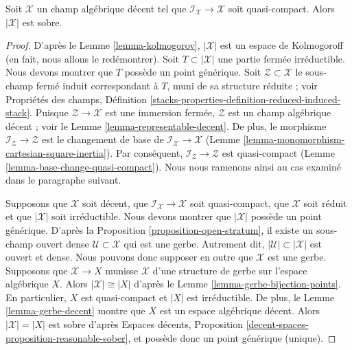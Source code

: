 \begin{proposition}
\label{proposition-decent-sober}
Soit $\mathcal{X}$ un champ alg\'ebrique d\'ecent tel que
$\mathcal{I}_\mathcal{X} \to \mathcal{X}$ soit quasi-compact.
Alors $|\mathcal{X}|$ est sobre.
\end{proposition}

\begin{proof}
D'apr\`es le Lemme \ref{lemma-kolmogorov}, $|\mathcal{X}|$ est un espace de Kolmogoroff
(en fait, nous allons le red\'emontrer).
Soit $T \subset |\mathcal{X}|$ une partie ferm\'ee irr\'eductible.
Nous devons montrer que $T$ poss\`ede un point g\'en\'erique.
Soit $\mathcal{Z} \subset \mathcal{X}$ le sous-champ ferm\'e induit
correspondant \`a $T$, muni de sa structure r\'eduite ; voir Propri\'et\'es des champs, D\'efinition
\ref{stacks-properties-definition-reduced-induced-stack}.
Puisque $\mathcal{Z} \to \mathcal{X}$ est une immersion ferm\'ee,
$\mathcal{Z}$ est un champ alg\'ebrique d\'ecent ; voir le
Lemme \ref{lemma-representable-decent}.
De plus, le morphisme $\mathcal{I}_\mathcal{Z} \to \mathcal{Z}$
est le changement de base de $\mathcal{I}_\mathcal{X} \to \mathcal{X}$
(Lemme \ref{lemma-monomorphism-cartesian-square-inertia}).
Par cons\'equent, $\mathcal{I}_\mathcal{Z} \to \mathcal{Z}$ est quasi-compact
(Lemme \ref{lemma-base-change-quasi-compact}).
Nous nous ramenons ainsi au cas examin\'e dans le paragraphe suivant.

\medskip\noindent
Supposons que $\mathcal{X}$ soit d\'ecent, que
$\mathcal{I}_\mathcal{X} \to \mathcal{X}$ soit quasi-compact,
que $\mathcal{X}$ soit r\'eduit et que $|\mathcal{X}|$ soit irr\'eductible.
Nous devons montrer que $|\mathcal{X}|$ poss\`ede un point g\'en\'erique.
D'apr\`es la Proposition \ref{proposition-open-stratum},
il existe un sous-champ ouvert dense $\mathcal{U} \subset \mathcal{X}$
qui est une gerbe. Autrement dit, $|\mathcal{U}| \subset |\mathcal{X}|$
est ouvert et dense.
Nous pouvons donc supposer en outre que $\mathcal{X}$ est une gerbe.
Supposons que $\mathcal{X} \to X$ munisse $\mathcal{X}$ d'une structure de gerbe sur
l'espace alg\'ebrique $X$. Alors $|\mathcal{X}| \cong |X|$ d'apr\`es le
Lemme \ref{lemma-gerbe-bijection-points}.
En particulier, $X$ est quasi-compact et $|X|$ est irr\'eductible.
De plus, le Lemme \ref{lemma-gerbe-decent} montre
que $X$ est un espace alg\'ebrique d\'ecent.
Alors $|\mathcal{X}| = |X|$ est sobre d'apr\`es
Espaces d\'ecents, Proposition \ref{decent-spaces-proposition-reasonable-sober},
et poss\`ede donc un point g\'en\'erique (unique).
\end{proof}




